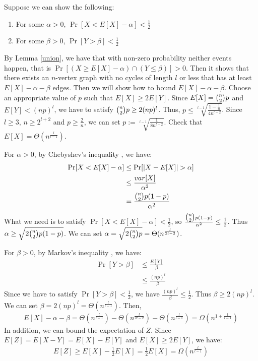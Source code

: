 Suppose we can show the following:
\begin{enumerate}
    \item For some $\alpha > 0$, $\Pr[X< E[X]-\alpha] <\frac{1}{2}$
    \item For some $\beta > 0$, $\Pr[Y > \beta]< \frac{1}{2}$
\end{enumerate}
By Lemma \ref{union}, we have that with non-zero probability neither events happen, that is $\Pr[(X\ge E[X]-\alpha)\cap (Y \le \beta)]> 0$. Then it shows that there exists an $n$-vertex graph with no cycles of length $l$ or less that has at least $E[X]-\alpha-\beta$ edges. 
Then we will show how to bound $E[X]-\alpha-\beta$.
Choose an appropriate value of $p$ such that $E[X] \ge 2E[Y]$. Since $E[X]=\tbinom{n}{2}p$ and $E[Y]<(np)^l$, we have to satisfy $\tbinom{n}{2}p \ge 2(np)^l$. Thus, $p\le  \sqrt[l-1]{\frac{1-\frac{1}{n}}{4n^{l-2}}}$. Since $l\ge 3$, $n\ge 2^{l+2}$ and $p\ge \frac{2}{n}$, we can set $p:=\sqrt[l-1]{\frac{1}{8n^{l-2}}}$. Check that $E[X]=\Theta (n^\frac{l}{l-1})$.%

For $\alpha > 0$, by 
Chebyshev's inequality
, we have:
\begin{align}
    \nonumber \Pr[X< E[X]-\alpha]&\le \Pr[|X-E[X]|> \alpha]\\ 
    \nonumber &\le \frac{var[X]}{\alpha^2}\\
    \nonumber &=\frac{\tbinom{n}{2}p(1-p)}{\alpha^2}
\end{align}
What we need is to satisfy $\Pr[X< E[X]-\alpha] < \frac{1}{2}$, so $\frac{\tbinom{n}{2}p(1-p)}{\alpha^2}\le \frac{1}{2} $. Thus $\alpha \ge \sqrt{2\tbinom{n}{2}p(1-p)}$. We can set $\alpha = \sqrt{2\tbinom{n}{2}p}=\Theta(n^{\frac{l}{2l-2}})$.

For $\beta > 0$, by 
Markov's inequality
, we have: 
\begin{align}
    \nonumber \Pr[Y >\beta] &\le \frac{E[Y]}{\beta}\\
    \nonumber & \le \frac{(np)^l}{\beta} 
\end{align}
Since we have to satisfy $\Pr[Y > \beta]< \frac{1}{2}$, we have $\frac{(np)^l}{\beta} \le \frac{1}{2}$. Thus $\beta \ge 2(np)^l$. We can set $\beta = 2(np)^l = \Theta (n^{\frac{l}{l-1}})$.
Then,
\begin{align}
    \nonumber E[X]-\alpha-\beta = \Theta (n^\frac{l}{l-1}) - \Theta(n^{\frac{l}{2l-2}}) - \Theta (n^{\frac{l}{l-1}})=\Omega (n^{1+\frac{1}{l-1}})
\end{align}
In addition, we can bound the expectation of $Z$.
Since $E[Z]=E[X-Y]=E[X]-E[Y]$ and $E[X]\ge 2E[Y]$, we have:
\begin{align}
    \nonumber E[Z]\ge E[X]-\frac{1}{2}E[X]=\frac{1}{2}E[X]=\Omega (n^\frac{l}{l-1})
\end{align}

